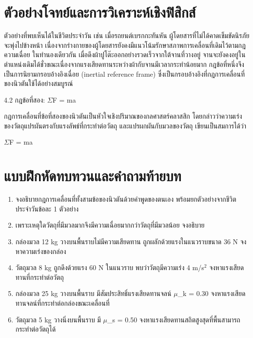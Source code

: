 \section{ตัวอย่างโจทย์และการวิเคราะห์เชิงฟิสิกส์}

\begin{examplebox}
ตัวอย่างที่พบเห็นได้ในชีวิตประจำวัน เช่น เมื่อรถยนต์เบรกกะทันหัน ผู้โดยสารที่ไม่ได้คาดเข็มขัดนิรภัยจะพุ่งไปข้างหน้า เนื่องจากร่างกายของผู้โดยสารยังคงมีแนวโน้มรักษาสภาพการเคลื่อนที่เดิมไว้ตามกฎความเฉื่อย ในทำนองเดียวกัน เมื่อดึงผ้าปูโต๊ะออกอย่างรวดเร็วจากใต้จานที่วางอยู่ จานจะยังคงอยู่ในตำแหน่งเดิมได้ชั่วขณะเนื่องจากแรงเสียดทานระหว่างผ้ากับจานมีเวลากระทำน้อยมาก กฎข้อที่หนึ่งจึงเป็นการนิยามกรอบอ้างอิงเฉื่อย (inertial reference frame) ซึ่งเป็นกรอบอ้างอิงที่กฎการเคลื่อนที่ของนิวตันใช้ได้อย่างสมบูรณ์

4.2 กฎข้อที่สอง: $\Sigma$F = ma

กฎการเคลื่อนที่ข้อที่สองของนิวตันเป็นหัวใจเชิงปริมาณของกลศาสตร์คลาสสิก โดยกล่าวว่าความเร่งของวัตถุแปรผันตรงกับแรงลัพธ์ที่กระทำต่อวัตถุ และแปรผกผันกับมวลของวัตถุ เขียนเป็นสมการได้ว่า

$\Sigma$F = ma
\end{examplebox}

\section{แบบฝึกหัดทบทวนและคำถามท้ายบท}

\begin{enumerate}
    \item จงอธิบายกฎการเคลื่อนที่ทั้งสามข้อของนิวตันด้วยคำพูดของตนเอง พร้อมยกตัวอย่างจากชีวิตประจำวันข้อละ 1 ตัวอย่าง
    \item เพราะเหตุใดวัตถุที่มีมวลมากจึงมีความเฉื่อยมากกว่าวัตถุที่มีมวลน้อย จงอธิบาย
    \item กล่องมวล 12 kg วางบนพื้นราบไม่มีความเสียดทาน ถูกผลักด้วยแรงในแนวราบขนาด 36 N จงหาความเร่งของกล่อง
    \item วัตถุมวล 8 kg ถูกดึงด้วยแรง 60 N ในแนวราบ พบว่าวัตถุมีความเร่ง 4 m/s$^2$ จงหาแรงเสียดทานที่กระทำต่อวัตถุ
    \item กล่องมวล 25 kg วางบนพื้นราบ มีสัมประสิทธิ์แรงเสียดทานจลน์ $\mu$\_k = 0.30 จงหาแรงเสียดทานจลน์ที่กระทำต่อกล่องขณะเคลื่อนที่
    \item วัตถุมวล 5 kg วางนิ่งบนพื้นราบ มี $\mu$\_s = 0.50 จงหาแรงเสียดทานสถิตสูงสุดที่พื้นสามารถกระทำต่อวัตถุได้
\end{enumerate}

